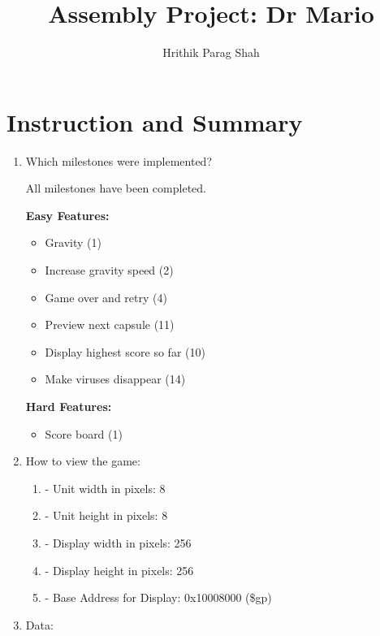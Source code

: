 \documentclass{article}
\title{Assembly Project: Dr Mario}
\author{Hrithik Parag Shah}
\begin{document}
\maketitle

\section{Instruction and Summary}

\begin{enumerate}

    \item Which milestones were implemented? 

        All milestones have been completed.

        \textbf{Easy Features:}
        \begin{itemize}
            \item Gravity (1)
            \item Increase gravity speed (2)
            \item Game over and retry (4)
            \item Preview next capsule (11)
            \item Display highest score so far (10)
            \item Make viruses disappear (14)
        \end{itemize}

        \textbf{Hard Features:}
        \begin{itemize}
            \item Score board (1)
        \end{itemize}

    \item How to view the game:
    
    \begin{enumerate}

    \item - Unit width in pixels: 8
    \item - Unit height in pixels: 8
    \item - Display width in pixels: 256
    \item - Display height in pixels: 256
    \item - Base Address for Display: 0x10008000 (\$gp)

    \end{enumerate}

    \item Data:
    

\end{enumerate}
\end{document}
